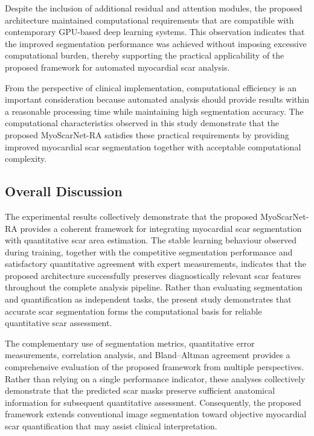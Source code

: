 Despite the inclusion of additional residual and attention modules, the proposed architecture maintained computational requirements that are compatible with contemporary GPU-based deep learning systems. This observation indicates that the improved segmentation performance was achieved without imposing excessive computational burden, thereby supporting the practical applicability of the proposed framework for automated myocardial scar analysis.

From the perspective of clinical implementation, computational efficiency is an important consideration because automated analysis should provide results within a reasonable processing time while maintaining high segmentation accuracy. The computational characteristics observed in this study demonstrate that the proposed MyoScarNet-RA satisfies these practical requirements by providing improved myocardial scar segmentation together with acceptable computational complexity.

\subsection{Overall Discussion}
\label{subsec:ch6-discussion}

The experimental results collectively demonstrate that the proposed MyoScarNet-RA provides a coherent framework for integrating myocardial scar segmentation with quantitative scar area estimation. The stable learning behaviour observed during training, together with the competitive segmentation performance and satisfactory quantitative agreement with expert measurements, indicates that the proposed architecture successfully preserves diagnostically relevant scar features throughout the complete analysis pipeline. Rather than evaluating segmentation and quantification as independent tasks, the present study demonstrates that accurate scar segmentation forms the computational basis for reliable quantitative scar assessment.

The complementary use of segmentation metrics, quantitative error measurements, correlation analysis, and Bland--Altman agreement provides a comprehensive evaluation of the proposed framework from multiple perspectives. Rather than relying on a single performance indicator, these analyses collectively demonstrate that the predicted scar masks preserve sufficient anatomical information for subsequent quantitative assessment. Consequently, the proposed framework extends conventional image segmentation toward objective myocardial scar quantification that may assist clinical interpretation.

